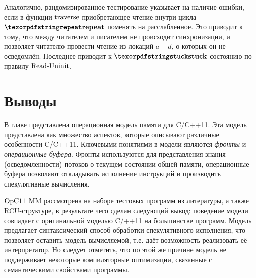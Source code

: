 Аналогично, рандомизированное тестирование указывает на наличие ошибки, если в функции ${\rm traverse}$
приобретающее чтение внутри цикла $\kw{repeat}$ поменять на расслабленное. Это приводит к тому, что между
читателем и писателем не происходит синхронизации, и позволяет читателю провести чтение из локаций $a-d$,
о которых он не осведомлён. Последнее приводит к $\kw{stuck}$-состоянию по правилу ${\rm Read\text{-}Uninit}$.

\section{Выводы}
\label{sec:opc11:results}
В главе представлена операционная модель памяти для C/C++11.
Эта модель представлена как множество аспектов, которые описывают различные особенности
C/C++11.
Ключевыми понятиями в модели являются \emph{фронты} и \emph{операционные буфера}.
Фронты используются для представления знания (осведомленности) потоков
о текущем состоянии общей памяти,
операционные буфера позволяют откладывать исполнение инструкций и
производить спекулятивные вычисления.

$\mathrm{OpC11}$ MM рассмотрена на наборе тестовых программ из литературы, а также RCU-структуре,
в результате чего сделан следующий вывод:
поведение модели совпадает с оригинальной моделью C/++11 на большинстве программ.
Модель предлагает синтаксический способ обработки спекулятивного исполнения, что
позволяет оставить модель вычисляемой, т.е. даёт возможность реализовать её интерпретатор.
Но следует отметить, что по этой же причине модель не поддерживает некоторые компиляторные оптимизации,
связанные с семантическими свойствами программы.
